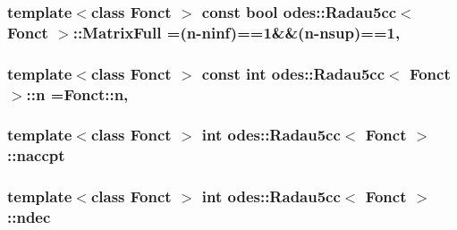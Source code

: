 \hypertarget{classodes_1_1Radau5cc_a8e67471bdbf858fff865561d859a066a}{
\subsubsection[{Matrix\-Full}]{\setlength{\rightskip}{0pt plus 5cm}template$<$class Fonct $>$ const bool {\bf odes\-::\-Radau5cc}$<$ Fonct $>$\-::Matrix\-Full =({\bf n}-\/{\bf ninf})==1\&\&({\bf n}-\/{\bf nsup})==1\hspace{0.3cm}{\ttfamily [static]}, {\ttfamily [private]}}}\label{classodes_1_1Radau5cc_a8e67471bdbf858fff865561d859a066a}
\hypertarget{classodes_1_1Radau5cc_a3be3f05d2cdf7268e7d09b62ad9ad494}{
\subsubsection[{n}]{\setlength{\rightskip}{0pt plus 5cm}template$<$class Fonct $>$ const int {\bf odes\-::\-Radau5cc}$<$ Fonct $>$\-::n =Fonct\-::n\hspace{0.3cm}{\ttfamily [static]}, {\ttfamily [private]}}}\label{classodes_1_1Radau5cc_a3be3f05d2cdf7268e7d09b62ad9ad494}
\hypertarget{classodes_1_1Radau5cc_a39e641457e737321720c75578189d0db}{
\subsubsection[{naccpt}]{\setlength{\rightskip}{0pt plus 5cm}template$<$class Fonct $>$ int {\bf odes\-::\-Radau5cc}$<$ Fonct $>$\-::naccpt\hspace{0.3cm}{\ttfamily [private]}}}\label{classodes_1_1Radau5cc_a39e641457e737321720c75578189d0db}
\hypertarget{classodes_1_1Radau5cc_af849903adc1f88a3bc6042994bec5621}{
\subsubsection[{ndec}]{\setlength{\rightskip}{0pt plus 5cm}template$<$class Fonct $>$ int {\bf odes\-::\-Radau5cc}$<$ Fonct $>$\-::ndec\hspace{0.3cm}{\ttfamily [private]}}}\label{classodes_1_1Radau5cc_af849903adc1f88a3bc6042994bec5621}

